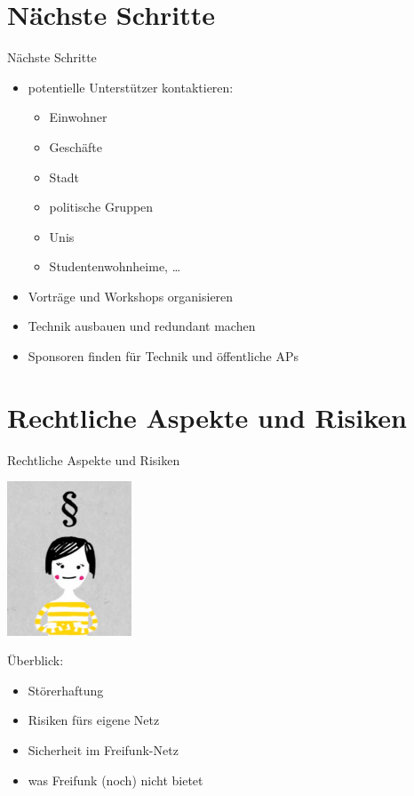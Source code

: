 \documentclass{beamer}
\begin{document}
\section{Nächste Schritte}
\begin{frame}{Nächste Schritte}
\vfill
\begin{itemize}
\pause\item potentielle Unterstützer kontaktieren:
	\begin{itemize}
		\pause\item Einwohner
		\pause\item Geschäfte
		\pause\item Stadt
		\pause\item politische Gruppen
		\pause\item Unis
		\pause\item Studentenwohnheime, \ldots
	\end{itemize}
\pause\item Vorträge und Workshops organisieren
\pause\item Technik ausbauen und redundant machen
\pause\item Sponsoren finden für Technik und öffentliche APs
\end{itemize}
\vfill
\end{frame}

\section{Rechtliche Aspekte und Risiken}
\begin{frame}{Rechtliche Aspekte und Risiken}
\begin{Row}
\begin{Cell}{1}
\vspace{0.1cm}
\includegraphics[width=3.7cm]{images/recht}
\end{Cell}
\begin{Cell}{2}
\vspace{1cm}
Überblick:
\begin{itemize}
\pause \item Störerhaftung
\pause \item Risiken fürs eigene Netz
\pause \item Sicherheit im Freifunk-Netz
\pause \item was Freifunk (noch) nicht bietet
\end{itemize}
\end{Cell}
\end{Row}
\end{frame}
\end{document}
